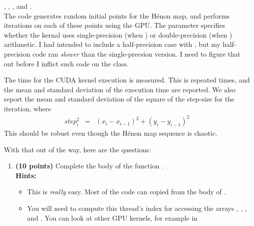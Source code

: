 \documentclass{article}
\newcommand{\Henon}{H\'{e}non}
\begin{document}
\begin{enumerate}
{{                  ,
                  ,
                  , and
                  .}}\\
          The code generates  random initial points for
          the \Henon{} map, and performs  iterations on each of these points
          using the GPU.
          The parameter  specifies whether the kernal uses single-precision (when ) or
          double-precision (when ) arithmetic.
          I had intended to include a half-precision case with , but my half-precision code ran
          \emph{slower} than the single-precsion version.
          I need to figure that out before I inflict such code on the class.
          \par
          The time for the CUDA kernel execution is measured.
          This is repeated  times, and the mean and standard deviation of the
          execution time are reported.  We also report the mean and standard deviation of the
          square of the step-size for the iteration, where
          \begin{displaymath}\begin{array}{rcl}
                  \mathit{step}_i^2 & = & (x_i - x_{i-1})^2 + (y_i - y_{i-1})^2
              \end{array}\end{displaymath}
          This should be robust even though the \Henon{} map sequence is chaotic.
          \par
          With that out of the way, here are the questions:
          \begin{enumerate}
              \item \textbf{(10 points)}
                    Complete the body of the  function .\\
                    \textbf{Hints:}
                    \begin{itemize}
                        \item This is \emph{really} easy.  Most of the code can copied from the
                              body of .
                        \item You will need to compute this thread's index for accessing the arrays
                              , , , and .
                              You can look at other GPU kernels, for example in

\end{itemize}
\end{enumerate}
\end{enumerate}
\end{document}
